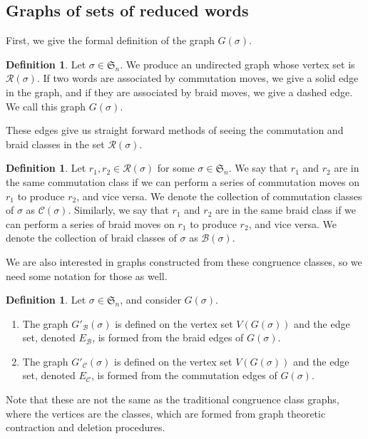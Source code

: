 \documentclass[11pt,reqno]{amsart}
\theoremstyle{definition}
\newtheorem{definition}[theorem]{Definition}
\theoremstyle{notation}
\newcommand{\calR}{\mathcal{R}}
\newcommand{\calB}{\mathcal{B}}
\newcommand{\calC}{\mathcal{C}}
\begin{document}
\subsection{Graphs of sets of reduced words} First, we give the formal definition of the graph $G(\sigma)$.

\begin{definition} 
Let $\sigma\in \mathfrak{S}_n$. We produce an undirected graph whose vertex set is $\calR(\sigma)$. If two words are associated by commutation moves, we give a solid edge in the graph, and if they are associated by braid moves, we give a dashed edge. We call this graph $G(\sigma)$.
\end{definition}

These edges give us straight forward methods of seeing the commutation and braid classes in the set $\calR(\sigma)$.

\begin{definition} 
Let $r_1, r_2 \in \calR(\sigma )$ for some $\sigma \in \mathfrak{S}_n$. We say that $r_1$ and $r_2$  are in the same commutation class if we can perform a series of commutation moves on $r_1$ to produce $r_2$, and vice versa. We denote the collection of commutation classes of $\sigma$ as $\calC(\sigma)$. Similarly, we say that $r_1$ and $r_2$  are in the same braid class if we can perform a series of braid moves on $r_1$ to produce $r_2$, and vice versa.  We denote the collection of braid classes of $\sigma$ as $\calB(\sigma)$.
\end{definition}


We are also interested in graphs constructed from these congruence classes, so we need some notation for those as well.

\begin{definition}\label{def:com_and_br_graphs}
    Let $\sigma\in \mathfrak{S}_n$, and consider $G(\sigma)$. 
    \begin{enumerate}
        \item The graph $G'_\calB(\sigma)$ is defined on the vertex set $V(G(\sigma))$ and the edge set, denoted $E_\calB$, is formed from the braid edges of $G(\sigma)$.
        \item The graph $G'_\calC(\sigma)$ is defined on the vertex set $V(G(\sigma))$ and the edge set, denoted $E_\calC$, is formed from the commutation edges of $G(\sigma)$.
    \end{enumerate}
\end{definition}

Note that these are not the same as the traditional congruence class graphs, where the vertices are the classes, which are formed from graph theoretic contraction and deletion procedures. 
\end{document}
